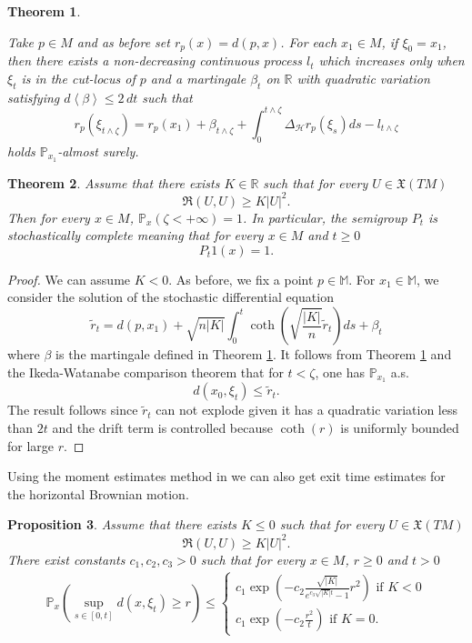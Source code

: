 \documentclass[11pt]{article}
\numberwithin{equation}{section}
\newtheorem{theorem}{Theorem}[section]
\newtheorem{proposition}[theorem]{Proposition}
\newcommand{\ang}[1]{\left<#1\right>}  %
\newcommand{\M}{\mathbb M}
\newcommand{\be}{\beta}
\newcommand{\ch}{\mathcal H}
\begin{document}
\begin{theorem} \label{th:Ito-radial} 

Take $p \in M$ and as before set $r_p (x) = d ( p , x )$. For each $x_1 \in M$, if $\xi_0 = x_1$, then there
  exists a non-decreasing continuous process $l_t$ which increases only
  when $\xi_t$ is in the cut-locus of $p$ and a martingale $\be_t$ on $\mathbb R$ with quadratic variation satisfying $d\ang{\beta} \le 2 \,dt$ such that
  \begin{equation} \label{eq:Ito-radial} 
  r_p ( \xi_{ t \wedge \zeta } ) = r_p ( x_1 ) + \be_{ t \wedge \zeta} + \int_0^{ t \wedge \zeta }
    \Delta_{\ch} r_p ( \xi_s ) ds - l_{ t \wedge \zeta}
  \end{equation}
  holds $\mathbb P_{x_1}$-almost surely.
\end{theorem}


\begin{theorem}
 Assume that there exists $K \in \mathbb{R}$ such that for every $U \in \mathfrak{X}(TM)$
\[
\mathfrak{R}(U,U) \ge K |U|^2.
\] 
Then for every $x \in M$, $\mathbb{P}_x (\zeta <+\infty)=1$. In particular, the semigroup $P_t$ is stochastically complete meaning that for every $x \in M$ and $t \ge 0$
\[
P_t 1(x)=1.
\] 
\end{theorem}

\begin{proof}
We can assume $K<0$. As before, we fix a point $p \in \M$. For $x_1 \in \M$, we consider
the solution of the stochastic differential equation
\begin{equation} \label{tildeXi}
  \tilde{r}_t =d (p,x_1)+ \sqrt{n |K|} \int_0^t \coth\left(\sqrt{\frac{|K|}{n}} \tilde{r}_t\right)  ds+\beta_t
\end{equation}
where $\beta$ is the martingale defined in Theorem
\ref{th:Ito-radial}.  It follows from Theorem \ref{th:Ito-radial} and the Ikeda-Watanabe
  comparison theorem \cite{Ik-Wa} that for $t < \zeta$, one has
  $\mathbb P_{x_1}$ a.s.
  \[
    d (x_0,\xi_t) \le \tilde{r}_t.
  \]
  The result follows  since $\tilde{r}_t $ can not explode given it has a quadratic variation less than $2t$ and  the drift term  is controlled because $\coth (r)$ is uniformly bounded for large $r$.
  \end{proof}
  
  Using the moment estimates method in \cite{MR4091106} we can also get exit time estimates for the horizontal Brownian motion.
  
  \begin{proposition}
  Assume that there exists $K \le 0$ such that for every $U \in \mathfrak{X}(TM)$
\[
\mathfrak{R}(U,U) \ge K |U|^2.
\] 
There exist constants $c_1,c_2,c_3>0$ such that for every $x \in M$, $r \ge 0$ and $t>0$
\begin{align*}
\mathbb{P}_x \left(\sup_{s\in [0,t]} d(x,\xi_t) \ge r \right) \le 
\begin{cases}
c_1 \exp\left(-c_2 \frac{ \sqrt{|K|}}{e^{c_3\sqrt{|K|}t}-1} r^2 \right) \text{ if } K<0 \\ 
c_1 \exp\left(-c_2 \frac{r^2}{t} \right) \text{ if } K=0.
\end{cases}
\end{align*}
  \end{proposition}
  
\end{document}
